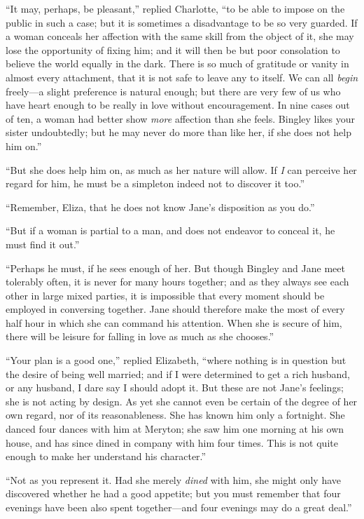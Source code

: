 \documentclass[12pt]{book}
\begin{document}
``It may, perhaps, be pleasant,'' replied Charlotte, ``to be able to impose on the public in such a case; but it is sometimes a disadvantage to be so very guarded. If a woman conceals her affection with the same skill from the object of it, she may lose the opportunity of fixing him; and it will then be but poor consolation to believe the world equally in the dark. There is so much of gratitude or vanity in almost every attachment, that it is not safe to leave any to itself. We can all \textit{begin} freely---a slight preference is natural enough; but there are very few of us who have heart enough to be really in love without encouragement. In nine cases out of ten, a woman had better show \textit{more} affection than she feels. Bingley likes your sister undoubtedly; but he may never do more than like her, if she does not help him on.''

``But she does help him on, as much as her nature will allow. If \textit{I} can perceive her regard for him, he must be a simpleton indeed not to discover it too.''

``Remember, Eliza, that he does not know Jane's disposition as you do.''

``But if a woman is partial to a man, and does not endeavor to conceal it, he must find it out.''

``Perhaps he must, if he sees enough of her. But though Bingley and Jane meet tolerably often, it is never for many hours together; and as they always see each other in large mixed parties, it is impossible that every moment should be employed in conversing together. Jane should therefore make the most of every half hour in which she can command his attention. When she is secure of him, there will be leisure for falling in love as much as she chooses.''

``Your plan is a good one,'' replied Elizabeth, ``where nothing is in question but the desire of being well married; and if I were determined to get a rich husband, or any husband, I dare say I should adopt it. But these are not Jane's feelings; she is not acting by design. As yet she cannot even be certain of the degree of her own regard, nor of its reasonableness. She has known him only a fortnight. She danced four dances with him at Meryton; she saw him one morning at his own house, and has since dined in company with him four times. This is not quite enough to make her understand his character.''

``Not as you represent it. Had she merely \textit{dined} with him, she might only have discovered whether he had a good appetite; but you must remember that four evenings have been also spent together---and four evenings may do a great deal.''
\end{document}
